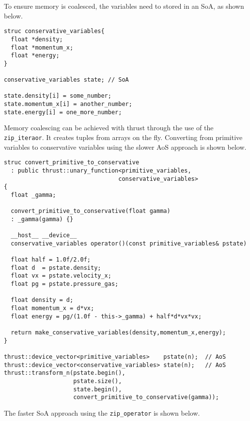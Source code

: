 To ensure memory is coalesced, the variables need to stored in an SoA, as shown below.
\begin{lstlisting}
struc conservative_variables{
  float *density;
  float *momentum_x;
  float *energy;
}

conservative_variables state; // SoA

state.density[i] = some_number;
state.momentum_x[i] = another_number;
state.energy[i] = one_more_number;
\end{lstlisting} 
Memory coalescing can be achieved with thrust through the use of the \verb+zip_iteraor+.  It creates tuples from arrays on the fly.  Converting from primitive variables to conservative variables using the slower AoS approach is shown below.
\begin{lstlisting}
struc convert_primitive_to_conservative 
  : public thrust::unary_function<primitive_variables,
                                 conservative_variables>
{
  float _gamma;
  
  convert_primitive_to_conservative(float gamma)
  : _gamma(gamma) {}

  __host__ __device__
  conservative_variables operator()(const primitive_variables& pstate)

  float half = 1.0f/2.0f;
  float d  = pstate.density;
  float vx = pstate.velocity_x;
  float pg = pstate.pressure_gas;

  float density = d;
  float momentum_x = d*vx;
  float energy = pg/(1.0f - this->_gamma) + half*d*vx*vx;
  
  return make_conservative_variables(density,momentum_x,energy);
}

thrust::device_vector<primitive_variables>    pstate(n);  // AoS
thrust::device_vector<conservative_variables> state(n);   // AoS
thrust::transform_n(pstate.begin(),
                    pstate.size(),
                    state.begin(),
                    convert_primitive_to_conservative(gamma));
\end{lstlisting} 
The faster SoA approach using the \verb+zip_operator+ is shown below.

